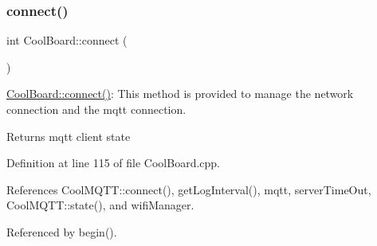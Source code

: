 \subsubsection{\texorpdfstring{connect()}{connect()}}
{\footnotesize\ttfamily int Cool\+Board\+::connect (\begin{DoxyParamCaption}{ }\end{DoxyParamCaption})}

\hyperlink{classCoolBoard_a519de78b807f8ec6463ff484eb925918}{Cool\+Board\+::connect()}\+: This method is provided to manage the network connection and the mqtt connection.

\begin{DoxyReturn}{Returns}
mqtt client state 
\end{DoxyReturn}


Definition at line 115 of file Cool\+Board.\+cpp.



References Cool\+M\+Q\+T\+T\+::connect(), get\+Log\+Interval(), mqtt, server\+Time\+Out, Cool\+M\+Q\+T\+T\+::state(), and wifi\+Manager.



Referenced by begin().


